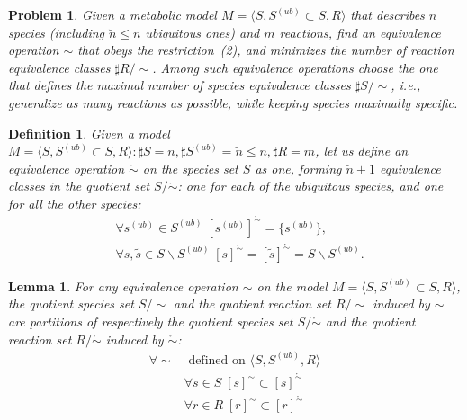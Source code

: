 \documentclass[10pt]{bmc_article}
\newenvironment{bmcformat}{\baselineskip20pt\sloppy\setboolean{publ}{false}}{\baselineskip20pt\sloppy}
\begin{document}
\begin{bmcformat}
\newtheorem{p0}[pbm]{Problem}
\begin{p0}
Given a metabolic model $M=\langle S, S^{(ub)} \subset S, R \rangle$ that describes $n$ species (including $\breve{n} \leq n$ ubiquitous ones) and $m$ reactions, find an equivalence operation $\sim$ that obeys the restriction~(2), and minimizes the number of reaction equivalence classes $\sharp R/\sim$. Among such equivalence operations choose the one that defines the maximal number of species equivalence classes $\sharp S/\sim$, i.e., generalize as many reactions as possible, while keeping species maximally specific.
\end{p0}
\newtheorem{eq0}[def]{Definition}
\begin{eq0}
Given a model $M=\langle S, S^{(ub)}\subset{S}, R \rangle : \sharp S = n, \sharp S^{(ub)}=\breve{n} \leq n, \sharp R = m$, let us define an equivalence operation $\mathring{\sim}$ on the species set $S$ as one, forming $\breve{n} + 1$ equivalence classes in the quotient set $S/\mathring{\sim}$: one for each of the ubiquitous species, and one for all the other species:
\begin{align*}
&\forall s^{(ub)} \in S^{(ub)} \;[s^{(ub)}]^{\mathring{\sim}} = \{s^{(ub)}\}, \\
&\forall s, \tilde{s} \in S\backslash S^{(ub)} \;[s]^{\mathring{\sim} } = [\tilde{s}]^{\mathring{\sim} } = S \backslash S^{(ub)}.
\end{align*}
\end{eq0}
\newtheorem{l1}[lm]{Lemma}
\begin{l1}
For any equivalence operation $\sim$ on the model $M=\langle S, S^{(ub)} \subset S, R \rangle$, the quotient species set $S/\sim$ and the quotient reaction set $R/\sim$ induced by $\sim$ are partitions of respectively the quotient species set $S/\mathring{\sim}$ and the quotient reaction set $R/\mathring{\sim} $ induced by $\mathring{\sim}$:
\begin{align*}
\forall \sim &\text{ defined on }\langle S, S^{(ub)}, R \rangle\\
&\forall s \in S \; [s]^{\sim} \subset [s]^{\mathring{\sim}} \\
&\forall r \in R \; [r]^{\sim} \subset [r]^{\mathring{\sim}} 
\end{align*}
\end{l1}


\end{bmcformat}
\end{document}
